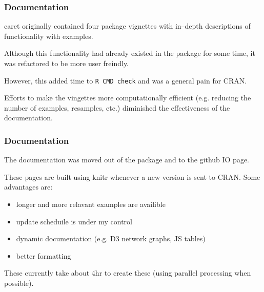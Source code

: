 \documentclass[12 pt]{beamer}\usepackage[]{graphicx}\usepackage[]{color}
\newcommand{\pkg}[1]{{\fontseries{b}\selectfont #1}}
\renewcommand{\pkg}[1]{{\color{darkgreen}\textsf{#1}}}
\begin{document}
  
  \begin{frame}[fragile]
\frametitle{Documentation}

\pkg{caret} originally contained four package vignettes with in--depth descriptions of functionality with examples. 

\vspace{.15in}

Although this functionality had already existed in the package for some time, it was refactored to be more user freindly. 

\vspace{.15in}

However, this added time to \texttt{R CMD check} and was a general pain for CRAN.

\vspace{.15in}

Efforts to make the vingettes more computationally efficient (e.g. reducing the number of examples, resamples, etc.) diminished the effectiveness of the documentation.  


\end{frame}

  
  \begin{frame}[fragile]
\frametitle{Documentation}

The documentation was moved out of the package and to the github IO page. 

\vspace{.15in}


These pages are built using \pkg{knitr} whenever a new version is sent to CRAN. Some advantages are:

\begin{itemize}
\item longer and more relavant examples are availible
\item update scheduile is under my control
\item dynamic documentation (e.g. D3 network graphs, JS tables)
\item better formatting
\end{itemize}

\vspace{.1in}

These currently take about 4hr to create these (using parallel processing when possible). 

\end{frame}
\end{document}

